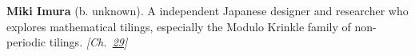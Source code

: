 \textbf{Miki Imura} (b. unknown). A independent Japanese designer and researcher who explores mathematical tilings, especially the Modulo Krinkle family of non-periodic tilings. \emph{[Ch.~\hyperref[ch:hatmonotile]{29}]}

